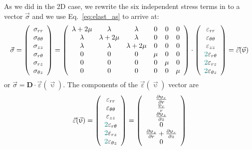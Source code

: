 As we did in the 2D case, we rewrite the six independent stress terms in to a vector $\vec\sigma$ and we use Eq.~\eqref{eq:elast_as} to arrive at:
\[
\vec{\sigma}=
\left(
\begin{array}{c}
\sigma_{rr} \\
\sigma_{\theta\theta} \\
\sigma_{zz} \\
\sigma_{r\theta} \\
\sigma_{rz} \\
\sigma_{\theta z} 
\end{array}
\right)
=
\left(
\begin{array}{cccccc}
\lambda+2\mu & \lambda & \lambda & 0 & 0 & 0 \\
\lambda & \lambda+2\mu & \lambda & 0 & 0 & 0 \\
\lambda & \lambda & \lambda+2\mu & 0 & 0 & 0 \\
0 & 0 & 0 & \mu & 0 & 0\\
0 & 0 & 0 & 0 & \mu & 0\\
0 & 0 & 0 & 0 & 0 & \mu
\end{array}
\right)
\cdot
\left(
\begin{array}{c}
\varepsilon_{rr} \\
\varepsilon_{\theta\theta} \\
\varepsilon_{zz} \\
{\color{teal}2}\varepsilon_{r\theta} \\
{\color{teal}2}\varepsilon_{rz} \\
{\color{teal}2}\varepsilon_{\theta z} 
\end{array}
\right)
=\vec\varepsilon(\vec \upupsilon)
\]
or $\vec\sigma = {\bm D} \cdot \vec\varepsilon(\vec \upupsilon)$. 
The components of the $\vec\varepsilon(\vec\upupsilon)$ vector are
\[
\vec\varepsilon(\vec \upupsilon)
=
\left(
\begin{array}{c}
\varepsilon_{rr} \\
\varepsilon_{\theta\theta} \\
\varepsilon_{zz} \\
{\color{teal}2}\varepsilon_{r\theta} \\
{\color{teal}2}\varepsilon_{rz} \\
{\color{teal}2}\varepsilon_{\theta z} 
\end{array}
\right)
=
\left(
\begin{array}{c}
\frac{\partial \upupsilon_r}{\partial r} \\ 
\frac{\upupsilon_r}{r} \\ 
\frac{\partial \upupsilon_z}{\partial z} \\ 
0 \\ 
\frac{\partial \upupsilon_z}{\partial r}+
\frac{\partial \upupsilon_r}{\partial z} \\ 
0
\end{array}
\right)
\]

